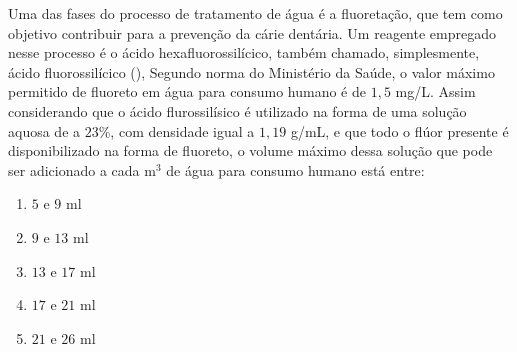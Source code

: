Uma das fases do processo de tratamento de água é a fluoretação, que tem como objetivo contribuir para a prevenção da cárie dentária.
Um reagente empregado nesse processo é o ácido hexafluorossilícico, também chamado, simplesmente, ácido fluorossilícico (), Segundo norma do Ministério da Saúde, o valor máximo permitido de fluoreto em água para consumo humano é de $1,5$ mg/L.
Assim considerando que o ácido flurossilísico é utilizado na forma de uma solução aquosa de  a $23\%$, com densidade igual a $1,19$ g/mL, e que todo o flúor presente é disponibilizado na forma de fluoreto, o volume máximo dessa solução que pode ser adicionado a cada m$^3$ de água para consumo humano está entre: 

\begin{enumerate}[label = (\scalealph{\alph*})]
	\item $5$ e $9$ ml
	\item $9$ e $13$ ml
	\item $13$ e $17$ ml
	\item $17$ e $21$ ml
	\item $21$ e $26$ ml
\end{enumerate}
